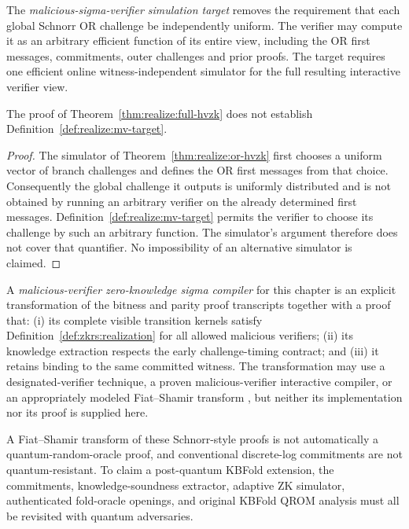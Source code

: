 \begin{definition}\label{def:realize:mv-target}
The \emph{malicious-sigma-verifier
simulation target} removes the
requirement that each global
Schnorr OR challenge be independently
uniform. The verifier may compute
it as an arbitrary efficient function
of its entire view, including the
OR first messages, commitments,
outer challenges and prior proofs.
The target requires one efficient
online witness-independent simulator
for the full resulting interactive
verifier view.
\end{definition}

\begin{proposition}\label{prop:realize:hv-not-mv}
The proof of
Theorem~\ref{thm:realize:full-hvzk}
does not establish
Definition~\ref{def:realize:mv-target}.
\end{proposition}
\begin{proof}
The simulator of
Theorem~\ref{thm:realize:or-hvzk}
first chooses a uniform vector
of branch challenges and
defines the OR first messages
from that choice. Consequently
the global challenge it outputs
is uniformly distributed and
is not obtained by running an
arbitrary verifier on the
already determined first messages.
Definition~\ref{def:realize:mv-target}
permits the verifier to choose
its challenge by such an
arbitrary function. The
simulator's argument therefore
does not cover that quantifier.
No impossibility of an alternative
simulator is claimed.
\end{proof}

\begin{definition}\label{def:realize:mv-compiler}
A \emph{malicious-verifier
zero-knowledge sigma compiler}
for this chapter is an explicit
transformation of the bitness
and parity proof transcripts
together with a proof that:
(i) its complete visible
transition kernels satisfy
Definition~\ref{def:zkrs:realization}
for all allowed malicious
verifiers; (ii) its knowledge
extraction respects the early
challenge-timing contract;
and (iii) it retains binding
to the same committed witness.
The transformation may use a
designated-verifier technique,
a proven malicious-verifier
interactive compiler, or an
appropriately modeled
Fiat--Shamir transform
\cite{FiatShamir1986}, but
neither its implementation nor
its proof is supplied here.
\end{definition}

\begin{remark}
A Fiat--Shamir transform of these
Schnorr-style proofs is not
automatically a quantum-random-oracle
proof, and conventional discrete-log
commitments are not quantum-resistant.
To claim a post-quantum KBFold
extension, the commitments,
knowledge-soundness extractor,
adaptive ZK simulator,
authenticated fold-oracle openings,
and original KBFold QROM
analysis must all be revisited
with quantum adversaries.
\end{remark}

